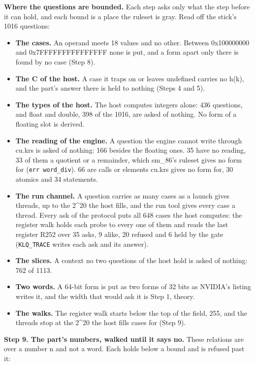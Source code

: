 \textbf{Where the questions are bounded.} Each step asks only what the step before it can hold, and each bound is a place the ruleset is gray. Read off the stick's 1016 questions:

\begin{itemize}
\item \textbf{The cases.} An operand meets 18 values and no other. Between 0x100000000 and 0x7FFFFFFFFFFFFFFF none is put, and a form apart only there is found by no case (Step 8).
\item \textbf{The C of the host.} A case it traps on or leaves undefined carries no h(k), and the part's answer there is held to nothing (Steps 4 and 5).
\item \textbf{The types of the host.} The host computes integers alone: 436 questions, and float and double, 398 of the 1016, are asked of nothing. No form of a floating slot is derived.
\item \textbf{The reading of the engine.} A question the engine cannot write through cu.krs is asked of nothing: 166 besides the floating ones. 35 have no reading, 33 of them a quotient or a remainder, which sm\_\allowbreak{}86's ruleset gives no form for (\texttt{err word\_\allowbreak{}div}). 66 are calls or elements cu.krs gives no form for, 30 atomics and 34 statements.
\item \textbf{The run channel.} A question carries as many cases as a launch gives threads, up to the 2\textasciicircum{}20 the host fills, and the run tool gives every case a thread. Every ask of the protocol puts all 648 cases the host computes: the register walk holds each probe to every one of them and reads the last register R252 over 35 asks, 9 alike, 20 refused and 6 held by the gate (\texttt{KLQ\_\allowbreak{}TRACE} writes each ask and its answer).
\item \textbf{The slices.} A context no two questions of the host hold is asked of nothing: 762 of 1113.
\item \textbf{Two words.} A 64-bit form is put as two forms of 32 bits as NVIDIA's listing writes it, and the width that would ask it is Step 1, theory.
\item \textbf{The walks.} The register walk starts below the top of the field, 255, and the threads stop at the 2\textasciicircum{}20 the host fills cases for (Step 9).
\end{itemize}

\textbf{Step 9. The part's numbers, walked until it says no.} These relations are over a number n and not a word. Each holds below a bound and is refused past it:

